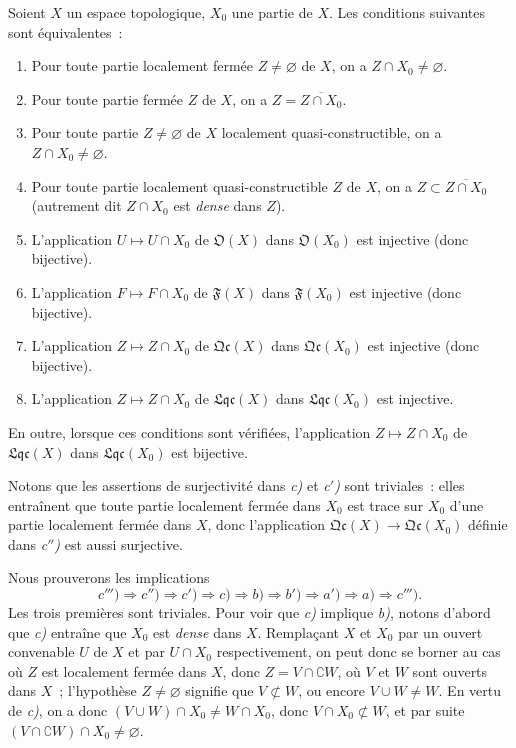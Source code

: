 \begin{proposition}[10.1.2]
\label{IV.10.1.2-fr}
Soient $X$ un espace topologique, $X_0$ une partie de $X$. Les conditions
suivantes sont équivalentes~:
\begin{enumerate}[label=\emph{\alph*)}]
  \item Pour toute partie localement fermée $Z\neq\varnothing$ de $X$, on a
  $Z\cap X_0\neq\varnothing$.
  \item[\emph{a$'$)}] Pour toute partie fermée $Z$ de $X$, on a
  $Z=\overline{Z\cap X_0}$.
  \item Pour toute partie $Z\neq\varnothing$ de $X$ localement
  quasi-constructible, on a $Z\cap X_0\neq\varnothing$.
  \item[\emph{b$'$)}] Pour toute partie localement quasi-constructible $Z$ de
  $X$, on a $Z\subset\overline{Z\cap X_0}$ (autrement dit $Z\cap X_0$ est
  \emph{dense} dans $Z$).
  \item L'application $U\mapsto U\cap X_0$ de $\mathfrak O(X)$ dans
  $\mathfrak O(X_0)$ est injective (donc bijective).
  \item[\emph{c$'$)}] L'application $F\mapsto F\cap X_0$ de $\mathfrak F(X)$
  dans $\mathfrak F(X_0)$ est injective (donc bijective).
  \item[\emph{c$''$)}] L'application $Z\mapsto Z\cap X_0$ de
  $\mathfrak{Qc}(X)$ dans $\mathfrak{Qc}(X_0)$ est injective (donc bijective).
  \item[\emph{c$'''$)}] L'application $Z\mapsto Z\cap X_0$ de
  $\mathfrak{Lqc}(X)$ dans $\mathfrak{Lqc}(X_0)$ est injective.
\end{enumerate}
En outre, lorsque ces conditions sont vérifiées, l'application
$Z\mapsto Z\cap X_0$ de $\mathfrak{Lqc}(X)$ dans $\mathfrak{Lqc}(X_0)$ est
bijective.
\end{proposition}

Notons que les assertions de surjectivité dans \emph{c)} et \emph{c$'$)} sont
triviales~: elles entraînent que toute partie localement fermée dans $X_0$ est
trace sur $X_0$ d'une partie localement fermée dans $X$, donc l'application
$\mathfrak{Qc}(X)\to\mathfrak{Qc}(X_0)$ définie dans \emph{c$''$)} est aussi
surjective.

Nous prouverons les implications
\[
c''')\Rightarrow c'')\Rightarrow c')\Rightarrow c)\Rightarrow b)
\Rightarrow b')\Rightarrow a')\Rightarrow a)\Rightarrow c''').
\]
Les trois premières sont triviales. Pour voir que \emph{c)} implique
\emph{b)}, notons d'abord que \emph{c)} entraîne que $X_0$ est \emph{dense}
dans $X$. Remplaçant $X$ et $X_0$ par un ouvert convenable $U$ de $X$ et par
$U\cap X_0$ respectivement, on peut donc se borner au cas où $Z$ est
localement fermée dans $X$, donc $Z=V\cap\complement W$, où $V$ et $W$ sont
ouverts dans $X$~; l'hypothèse $Z\neq\varnothing$ signifie que
$V\not\subset W$, ou encore $V\cup W\neq W$. En vertu de \emph{c)}, on a donc
$(V\cup W)\cap X_0\neq W\cap X_0$, donc $V\cap X_0\not\subset W$, et par
suite $(V\cap\complement W)\cap X_0\neq\varnothing$.

